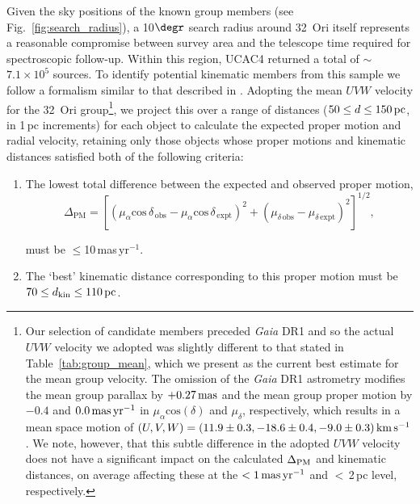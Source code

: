 \documentclass[usenatbib]{mnras}
\newcommand{\masyr}{mas\,yr$^{-1}$}
\begin{document}
Given the sky positions of the known group members (see
Fig.~\ref{fig:search_radius}), a 10$\degr$ search radius around 32~Ori
itself represents a reasonable compromise between survey area and the
telescope time required for spectroscopic follow-up. Within this
region, UCAC4 returned a total of $\sim$\,$7.1 \times 10^{5}$
sources. To identify potential kinematic members from this sample we
follow a formalism similar to that described in
\cite{Murphy15}. Adopting the mean $UVW$ velocity for the 32~Ori group\footnote{Our selection of candidate members
preceded \emph{Gaia} DR1 and so the actual $UVW$ velocity we adopted
was slightly different to that stated in Table~\ref{tab:group_mean}, which we present
as the current best estimate for the mean group velocity. The omission of
the \emph{Gaia} DR1 astrometry modifies the mean group parallax by $+0.27\,\rm{mas}$ and
the mean group proper motion by $-0.4$ and $0.0\,\rm{mas\,yr^{-1}}$ in
$\mu_{\alpha} \mathrm{cos} (\delta)$ and $\mu_{\delta}$, respectively, which results in
a mean space motion of $(U, V, W) = (11.9\pm0.3, -18.6\pm0.4, -9.0\pm0.3)\,\rm{km\,s^{-1}}$.
We note, however, that this subtle difference in the adopted $UVW$ velocity does not
have a significant impact on the calculated $\Delta_{\rm{PM}}$ and kinematic distances,
on average affecting these at the $< 1\,\rm{mas\,yr^{-1}}$ and $<$\,2\,pc level, respectively.},
we project this over a
range of distances ($50 \leq d \leq 150\,\rm{pc}$, in 1\,pc
increments) for each object to calculate the expected proper motion
and radial velocity, retaining only those objects whose proper motions
and kinematic distances satisfied both of the following criteria:

\begin{enumerate}
\item The lowest total difference between the expected and observed
  proper motion,
\begin{equation}
\Delta_{\mathrm{PM}} = \left[ (\mu_{\alpha} \mathrm{cos}\, \delta_{\mathrm{\,obs}} - \mu_{\alpha} \mathrm{cos}\, \delta_{\mathrm{\,expt}})^2 + (\mu_{\delta\, \mathrm{obs}} - \mu_{\delta\, \mathrm{expt}})^2\right]^{1/2},
\end{equation}

\noindent must be $\leq$10\,\masyr.\\

\item The `best' kinematic distance corresponding to this proper
  motion must be $70 \leq d_{\rm kin} \leq 110\,\rm{pc}$.
\end{enumerate}
\end{document}
